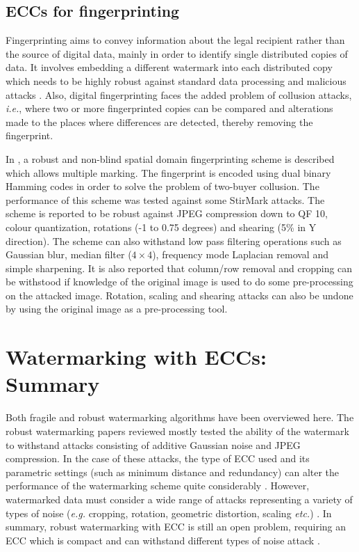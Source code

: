 \documentclass[12pt]{report}
\begin{document}
\subsection{ECCs for fingerprinting}
Fingerprinting aims to convey information about the legal recipient rather than the source of digital data, mainly
in order to identify single distributed copies of data. It involves embedding a different watermark into each distributed copy
which needs to be highly robust against standard data processing and malicious attacks \cite{ECCb4:book}. Also, digital fingerprinting
faces the added problem of collusion attacks, \emph{i.e.}, where two or more fingerprinted copies can be compared and 
alterations made to
the places where
differences are detected, thereby removing the fingerprint. 

In \cite{ECCb4:ferr}, a robust and non-blind spatial domain fingerprinting scheme is described which allows multiple marking. 
The fingerprint is encoded using dual binary
Hamming codes in order to solve the problem of two-buyer collusion. The performance of this scheme 
was tested against some StirMark attacks.
The scheme is reported to be robust against
JPEG compression down to QF 10, colour quantization, rotations (-1 to 0.75 degrees) and shearing (5\% in Y direction).
The scheme can also withstand low pass filtering operations such as Gaussian blur, median filter ($4 \times 4$),
frequency mode Laplacian removal and simple sharpening. It is also reported that column/row removal and cropping can 
be withstood if knowledge of the original image is used to do some pre-processing on the attacked image. Rotation, 
scaling and shearing attacks can also be undone by using the original image as a pre-processing tool.

\section{Watermarking with ECCs: Summary}
Both fragile and robust watermarking algorithms have been overviewed here. The robust watermarking papers reviewed mostly tested
the ability of the watermark to withstand attacks consisting of additive Gaussian noise and JPEG compression. 
In the case of these attacks, the type of ECC used and its parametric settings
(such as minimum distance and redundancy) can alter the performance of the watermarking scheme 
quite considerably \cite{ECCb4:th3, ECCb4:th4, ECCb4:th5}.
However, watermarked data must consider a wide range of attacks representing a variety of types of noise
(\emph{e.g.} cropping, rotation, geometric distortion, scaling \emph{etc.}) \cite{ECCb4:book}. 
In summary, robust watermarking with ECC is still an open
problem, requiring an ECC which is compact and can withstand different types of noise attack \cite{ECCb4:book}. 
\end{document}

